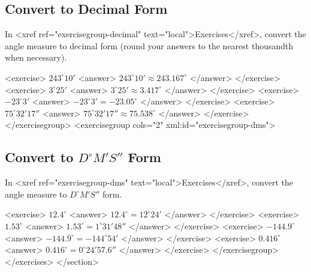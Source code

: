       \subsection*{Convert to Decimal Form}
        
            In <xref ref="exercisegroup-decimal" text="local">Exercises</xref>, convert the angle measure to decimal form (round your answers to the nearest thousandth when necessary).
        
        <exercise>
                $243^{\circ}10'$
            <answer>
               $243^{\circ}10' \approx 243.167^{\circ}$
            </answer>
        </exercise>
        <exercise>
                $3^{\circ}25'$
            <answer>
               $3^{\circ}25' \approx 3.417^{\circ}$
            </answer>
        </exercise>
        <exercise>
                $-23^{\circ}3'$
            <answer>
               $-23^{\circ}3' = -23.05^{\circ}$
            </answer>
        </exercise>
        <exercise>
                $75^{\circ}32'17''$
            <answer>
               $75^{\circ}32'17'' \approx 75.538^{\circ}$
            </answer>
        </exercise>
    </exercisegroup>
    <exercisegroup cols="2" xml:id="exercisegroup-dms">
      \subsection*{Convert to $D^{\circ}M'S''$ Form}
        
            In <xref ref="exercisegroup-dms" text="local">Exercises</xref>, convert the angle measure to $D^{\circ}M'S''$ form.
        
        <exercise>
                $12.4^{\circ}$
            <answer>
               $12.4^{\circ} = 12^{\circ}24'$
            </answer>
        </exercise>
        <exercise>
                $1.53^{\circ}$
            <answer>
               $1.53^{\circ} = 1^{\circ}31'48''$
            </answer>
        </exercise>
        <exercise>
                $-144.9^{\circ}$
            <answer>
               $-144.9^{\circ} = -144^{\circ}54'$
            </answer>
        </exercise>
        <exercise>
                $0.416^{\circ}$
            <answer>
               $0.416^{\circ} = 0^{\circ}24'57.6''$
            </answer>
        </exercise>
    </exercisegroup>
</exercises>
</section>